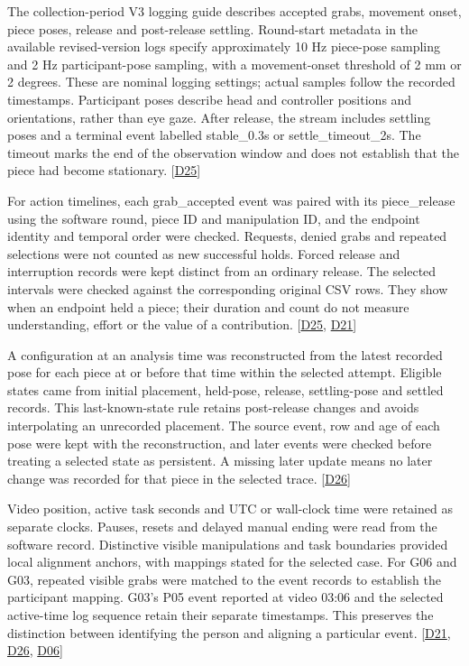 The collection-period V3 logging guide describes accepted grabs, movement onset, piece poses, release and post-release settling. Round-start metadata in the available revised-version logs specify approximately 10 Hz piece-pose sampling and 2 Hz participant-pose sampling, with a movement-onset threshold of 2 mm or 2 degrees. These are nominal logging settings; actual samples follow the recorded timestamps. Participant poses describe head and controller positions and orientations, rather than eye gaze. After release, the stream includes settling poses and a terminal event labelled stable\_0.3s or settle\_timeout\_2s. The timeout marks the end of the observation window and does not establish that the piece had become stationary. [\hyperlink{src:D25}{D25}]

For action timelines, each grab\_accepted event was paired with its piece\_release using the software round, piece ID and manipulation ID, and the endpoint identity and temporal order were checked. Requests, denied grabs and repeated selections were not counted as new successful holds. Forced release and interruption records were kept distinct from an ordinary release. The selected intervals were checked against the corresponding original CSV rows. They show when an endpoint held a piece; their duration and count do not measure understanding, effort or the value of a contribution. [\hyperlink{src:D25}{D25}, \hyperlink{src:D21}{D21}]

A configuration at an analysis time was reconstructed from the latest recorded pose for each piece at or before that time within the selected attempt. Eligible states came from initial placement, held-pose, release, settling-pose and settled records. This last-known-state rule retains post-release changes and avoids interpolating an unrecorded placement. The source event, row and age of each pose were kept with the reconstruction, and later events were checked before treating a selected state as persistent. A missing later update means no later change was recorded for that piece in the selected trace. [\hyperlink{src:D26}{D26}]

Video position, active task seconds and UTC or wall-clock time were retained as separate clocks. Pauses, resets and delayed manual ending were read from the software record. Distinctive visible manipulations and task boundaries provided local alignment anchors, with mappings stated for the selected case. For G06 and G03, repeated visible grabs were matched to the event records to establish the participant mapping. G03's P05 event reported at video 03:06 and the selected active-time log sequence retain their separate timestamps. This preserves the distinction between identifying the person and aligning a particular event. [\hyperlink{src:D21}{D21}, \hyperlink{src:D26}{D26}, \hyperlink{src:D06}{D06}]


